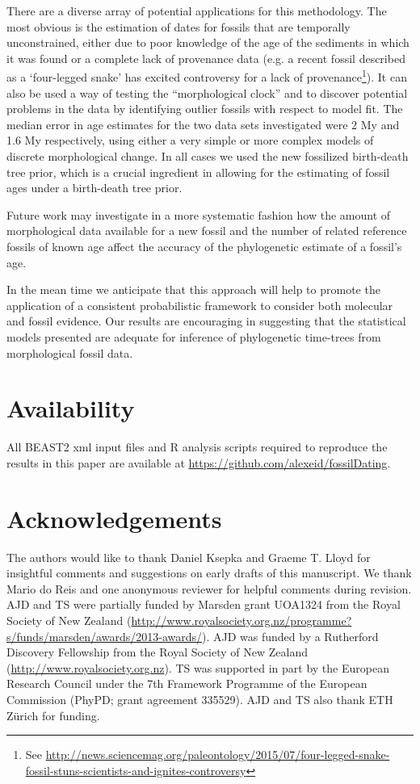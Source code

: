 \documentclass[11pt]{article}
\begin{document}
There are a diverse array of potential applications for this methodology. 
The most obvious is the estimation of dates for fossils that are temporally unconstrained, either due to poor knowledge of the age of the sediments in which it was found or a complete lack of provenance data (e.g. a recent fossil described as a `four-legged snake' has excited controversy for a lack of provenance\footnote{See \url{http://news.sciencemag.org/paleontology/2015/07/four-legged-snake-fossil-stuns-scientists-and-ignites-controversy}}). 
It can also be used a way of testing the ``morphological clock'' and to discover potential problems in the data by identifying outlier fossils with respect to model fit. 
The median error in age estimates for the two data sets investigated were 2 My and 1.6 My respectively, using either a very simple or more complex models of discrete morphological change. 
In all cases we used the new fossilized birth-death tree prior, which is a crucial ingredient in allowing for the estimating of fossil ages under a birth-death tree prior. 

Future work may investigate in a more systematic fashion how the amount of morphological data available for a new fossil and the number of related reference fossils of known age affect the accuracy of the phylogenetic estimate of a fossil's age.

In the mean time we anticipate that this approach will help to promote the application of a consistent probabilistic framework to consider both molecular and fossil evidence. Our results are encouraging in suggesting that the statistical models presented are adequate for inference of phylogenetic time-trees from morphological fossil data.

\section*{Availability}

All BEAST2 xml input files and R analysis scripts required to reproduce the results in this paper are available at \url{https://github.com/alexeid/fossilDating}.

\section*{Acknowledgements}

The authors would like to thank Daniel Ksepka and Graeme T. Lloyd for insightful comments and suggestions on early drafts of this manuscript. We thank Mario do Reis and one anonymous reviewer for helpful comments during revision. AJD and TS were partially funded by Marsden grant UOA1324 from the Royal Society of New Zealand (\url{http://www.royalsociety.org.nz/programme?s/funds/marsden/awards/2013-awards/}). AJD was funded by a Rutherford Discovery Fellowship from the Royal Society of New Zealand (\url{http://www.royalsociety.org.nz}).  TS was supported in part by the European Research Council under the 7th Framework Programme of the European Commission (PhyPD; grant agreement 335529). AJD and TS also thank ETH Z\"{u}rich for funding.




\end{document}
